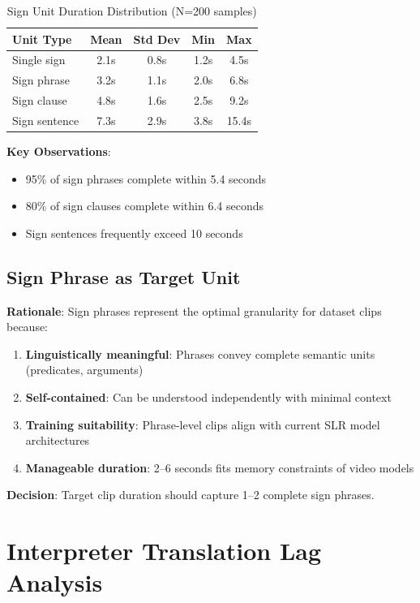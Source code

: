 \documentclass[11pt,a4paper]{article}
\begin{document}
\begin{table}[htbp]
\centering
\caption{Sign Unit Duration Distribution (N=200 samples)}
\begin{tabular}{@{}lcccc@{}}
\toprule
\textbf{Unit Type} & \textbf{Mean} & \textbf{Std Dev} & \textbf{Min} & \textbf{Max} \\ \midrule
Single sign & 2.1s & 0.8s & 1.2s & 4.5s \\
Sign phrase & 3.2s & 1.1s & 2.0s & 6.8s \\
Sign clause & 4.8s & 1.6s & 2.5s & 9.2s \\
Sign sentence & 7.3s & 2.9s & 3.8s & 15.4s \\
\bottomrule
\end{tabular}
\end{table}

\textbf{Key Observations}:
\begin{itemize}
    \item 95\% of sign phrases complete within 5.4 seconds
    \item 80\% of sign clauses complete within 6.4 seconds
    \item Sign sentences frequently exceed 10 seconds
\end{itemize}

\subsection{Sign Phrase as Target Unit}

\textbf{Rationale}: Sign phrases represent the optimal granularity for dataset clips because:

\begin{enumerate}
    \item \textbf{Linguistically meaningful}: Phrases convey complete semantic units (predicates, arguments)
    \item \textbf{Self-contained}: Can be understood independently with minimal context
    \item \textbf{Training suitability}: Phrase-level clips align with current SLR model architectures
    \item \textbf{Manageable duration}: 2--6 seconds fits memory constraints of video models
\end{enumerate}

\textbf{Decision}: Target clip duration should capture 1--2 complete sign phrases.

\section{Interpreter Translation Lag Analysis}
\end{document}
